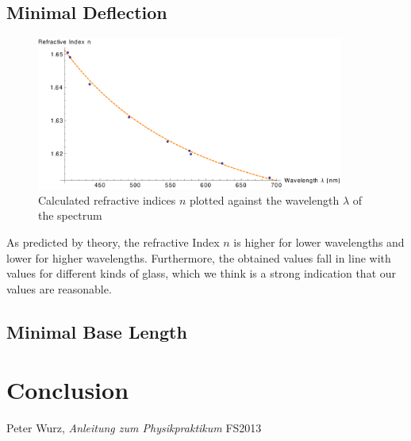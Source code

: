 \documentclass{scrreprt}
\begin{document}
\subsection{Minimal Deflection}
\begin{figure}[H]
	\centering
  \includegraphics[width=0.9\textwidth]{diag/meas_and_fit.pdf}
	\caption{Calculated refractive indices $n$ plotted against the wavelength $\lambda$ of the spectrum}
	\label{fig:meas_and_fit}
\end{figure}
As predicted by theory, the refractive Index $n$ is higher for lower wavelengths and lower for higher wavelengths. Furthermore, the obtained values fall in line with values for different kinds of glass, which we think is a strong indication that our values are reasonable.

\subsection{Minimal Base Length}


\section{Conclusion}

\begin{thebibliography}{9}

  Peter Wurz,
  \emph{Anleitung zum Physikpraktikum}
  FS2013

\end{thebibliography}
\end{document}
